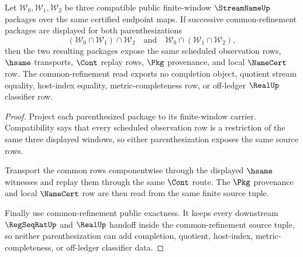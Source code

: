 \begin{theorem}
\label{thm:streamname-common-refinement-associativity}
Let $\mathcal W_0,\mathcal W_1,\mathcal W_2$ be three compatible public finite-window $\StreamNameUp$ packages over the same certified endpoint maps. If successive common-refinement packages are displayed for both parenthesizations
$$
(\mathcal W_0 \cap \mathcal W_1) \cap \mathcal W_2
\quad\text{and}\quad
\mathcal W_0 \cap (\mathcal W_1 \cap \mathcal W_2),
$$
then the two resulting packages expose the same scheduled observation rows, $\hsame$ transports, $\Cont$ replay rows, $\Pkg$ provenance, and local $\NameCert$ row. The common-refinement read exports no completion object, quotient stream equality, host-index equality, metric-completeness row, or off-ledger $\RealUp$ classifier row.
\end{theorem}
\begin{proof}
Project each parenthesized package to its finite-window carrier. Compatibility says that every scheduled observation row is a restriction of the same three displayed windows, so either parenthesization exposes the same source rows.

Transport the common rows componentwise through the displayed $\hsame$ witnesses and replay them through the same $\Cont$ route. The $\Pkg$ provenance and local $\NameCert$ row are then read from the same finite source tuple.

Finally use common-refinement public exactness. It keeps every downstream $\RegSeqRatUp$ and $\RealUp$ handoff inside the common-refinement source tuple, so neither parenthesization can add completion, quotient, host-index, metric-completeness, or off-ledger classifier data.
\end{proof}
